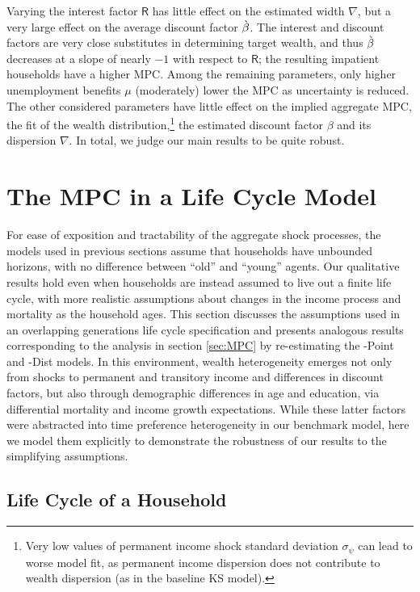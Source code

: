 \documentclass[12pt,titlepage]{econtex}
\begin{document}
Varying the interest factor $\mathsf{R}$ has little effect on the estimated width $\nabla$, but a very large effect on the average discount factor $\grave{\beta}$.  The interest and discount factors are very close substitutes in determining target wealth, and thus $\grave{\beta}$ decreases at a slope of nearly $-1$ with respect to $\mathsf{R}$; the resulting impatient households have a higher MPC.  Among the remaining parameters, only higher unemployment benefits $\mu$ (moderately) lower the MPC as uncertainty is reduced.  The other considered parameters have little effect on the implied aggregate MPC, the fit of the wealth distribution,\footnote{Very low values of permanent income shock standard deviation $\sigma_\psi$ can lead to worse model fit, as permanent income dispersion does not contribute to wealth dispersion (as in the baseline KS model).} the estimated discount factor $\beta$ and its dispersion $\nabla$.  In total, we judge our main results to be quite robust.



\section{The MPC in a Life Cycle Model}\label{sec:LCM}

For ease of exposition and tractability of the aggregate shock processes, the models used in previous sections assume that households have unbounded horizons, with no difference between ``old'' and ``young'' agents.  Our qualitative results hold even when households are instead assumed to live out a finite life cycle, with more realistic assumptions about changes in the income process and mortality as the household ages.  This section discusses the assumptions used in an overlapping generations life cycle specification and presents analogous results corresponding to the analysis in section \ref{sec:MPC} by re-estimating the \Discount-Point and \Discount-Dist models.  In this environment, wealth heterogeneity emerges not only from shocks to permanent and transitory income and differences in discount factors, but also through demographic differences in age and education, via differential mortality and income growth expectations.  While these latter factors were abstracted into time preference heterogeneity in our benchmark model, here we model them explicitly to demonstrate the robustness of our results to the simplifying assumptions.

\subsection{Life Cycle of a Household}\label{sec:LifeCycle}
\end{document}
